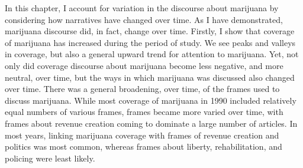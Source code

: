 In this chapter, I account for variation in the discourse about marijuana by considering how narratives have changed over time. As I have demonstrated, marijuana discourse did, in fact, change over time. Firstly, I show that coverage of marijuana has increased during the period of study. We see peaks and valleys in coverage, but also a general upward trend for attention to marijuana. Yet, not only did coverage discourse about marijuana become less negative, and more neutral, over time, but the ways in which marijuana was discussed also changed over time. There was a general broadening, over time, of the frames used to discuss marijuana. While most coverage of marijuana in 1990 included relatively equal numbers of various frames, frames became more varied over time, with frames about revenue creation coming to dominate a large number of articles. In most years, linking marijuana coverage with frames of revenue creation and politics was most common, whereas frames about liberty, rehabilitation, and policing were least likely. %


